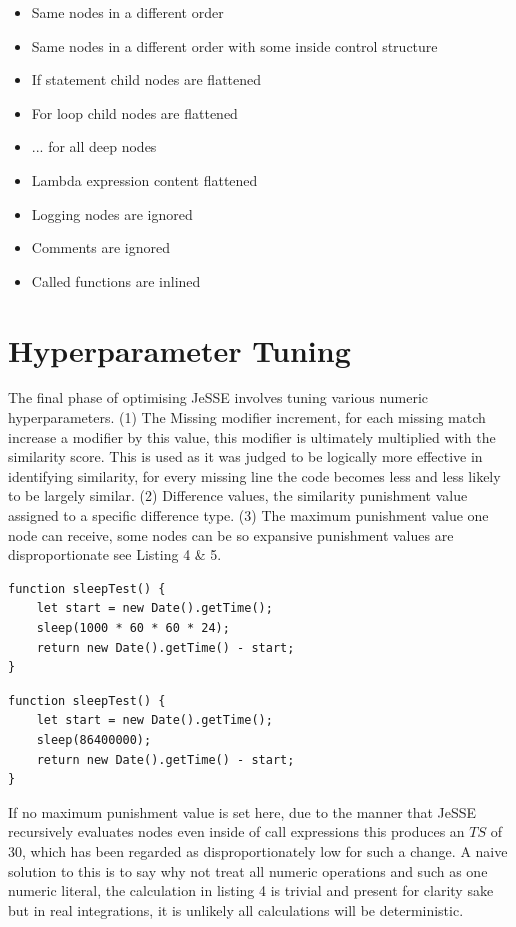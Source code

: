 \documentclass[jou,apacite]{apa6}
\begin{document}
\begin{itemize}
  		\setlength\itemsep{-0.2em}
		\item Same nodes in a different order
		\item Same nodes in a different order with some inside control structure 
		\item If statement child nodes are flattened
		\item For loop child nodes are flattened
		\item ... for all deep nodes
		\item Lambda expression content flattened
		\item Logging nodes are ignored
		\item Comments are ignored
		\item Called functions are inlined
	\end{itemize}

\section{Hyperparameter Tuning}
The final phase of optimising JeSSE involves tuning various numeric hyperparameters. (1) The Missing modifier increment, for each missing match increase a modifier by this value, this modifier is ultimately multiplied with the similarity score. This is used as it was judged to be logically more effective in identifying similarity, for every missing line the code becomes less and less likely to be largely similar. (2) Difference values, the similarity punishment value assigned to a specific difference type. (3) The maximum punishment value one node can receive, some nodes can be so expansive punishment values are disproportionate see Listing 4 \& 5.

\begin{lstlisting}[caption=Function returning contents of previous call expression]
function sleepTest() {
    let start = new Date().getTime();
    sleep(1000 * 60 * 60 * 24);
    return new Date().getTime() - start;
}
\end{lstlisting}

\begin{lstlisting}[caption=Function returning contents of previous call expression]
function sleepTest() {
    let start = new Date().getTime();
    sleep(86400000);
    return new Date().getTime() - start;
}

\end{lstlisting}

If no maximum punishment value is set here, due to the manner that JeSSE recursively evaluates nodes even inside of call expressions this produces an $TS$ of 30, which has been regarded as disproportionately low for such a change. A naive solution to this is to say why not treat all numeric operations and such as one numeric literal, the calculation in listing 4 is trivial and present for clarity sake but in real integrations, it is unlikely all calculations will be deterministic.
\end{document}
